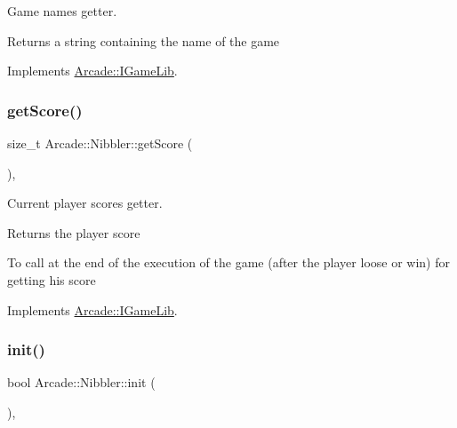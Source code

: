 Game name\textquotesingle{}s getter. 

\begin{DoxyReturn}{Returns}
a string containing the name of the game 
\end{DoxyReturn}


Implements \hyperlink{class_arcade_1_1_i_game_lib_afd2652d62ebfda4caa5d0c05ff40ed61}{Arcade\+::\+I\+Game\+Lib}.

\mbox{\label{class_arcade_1_1_nibbler_a861f3bebe3b7f5efe1f3a46eb71957bb}} 
\subsubsection{\texorpdfstring{get\+Score()}{getScore()}}
{\footnotesize\ttfamily size\+\_\+t Arcade\+::\+Nibbler\+::get\+Score (\begin{DoxyParamCaption}{ }\end{DoxyParamCaption})\hspace{0.3cm}{\ttfamily [final]}, {\ttfamily [virtual]}}



Current player score\textquotesingle{}s getter. 

\begin{DoxyReturn}{Returns}
the player score
\end{DoxyReturn}
To call at the end of the execution of the game (after the player loose or win) for getting his score 

Implements \hyperlink{class_arcade_1_1_i_game_lib_a00cdcad68c670aecbcc249a2995833b6}{Arcade\+::\+I\+Game\+Lib}.

\mbox{\label{class_arcade_1_1_nibbler_a244e3c4751d74cab7e4e6ef7b80d0b36}} 
\subsubsection{\texorpdfstring{init()}{init()}}
{\footnotesize\ttfamily bool Arcade\+::\+Nibbler\+::init (\begin{DoxyParamCaption}{ }\end{DoxyParamCaption})\hspace{0.3cm}{\ttfamily [final]}, {\ttfamily [virtual]}}



